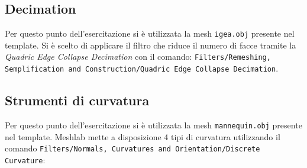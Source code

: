 \newpage
\subsection{Decimation}
Per questo punto dell'esercitazione si è utilizzata la mesh \texttt{igea.obj} presente nel template. Si è scelto di applicare il filtro che riduce il numero di facce tramite la \textit{Quadric Edge Collapse Decimation} con il comando: \texttt{Filters/\-Remeshing, \-Semplification\- and \-Construction/\-Quadric \-Edge \-Collapse \-Decimation}.

\begin{figure}[hbt]
    \centering
	\vspace{-0.2cm}
\end{figure}

\subsection{Strumenti di curvatura}
Per questo punto dell'esercitazione si è utilizzata la mesh \texttt{mannequin.obj} presente nel template. Meshlab mette a disposizione 4 tipi di curvatura utilizzando il comando \texttt{Filters/\-Normals, \-Curvatures and \-Orientation/\-Discrete \-Curvature}:

\begin{figure}[hbt]
    \centering
	\vspace{-0.2cm}
\end{figure}












%


